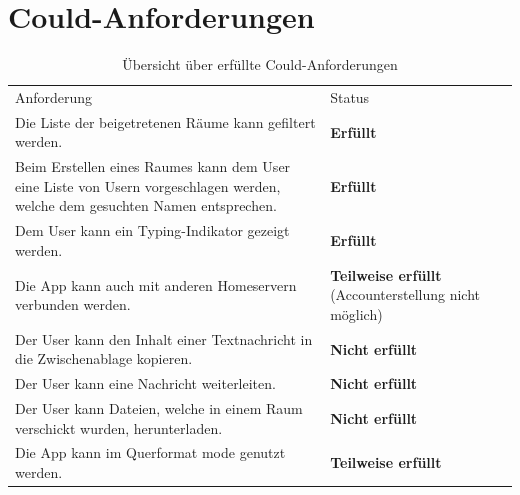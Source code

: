     \section{Could-Anforderungen}\label{sec:could-anforderungen}
    \begin{table}[h]
        \centering
        \begin{tabular}{p{}|p{}}
            Anforderung & Status\\
            \cline{1-2}
            Die Liste der beigetretenen Räume kann gefiltert werden. &  \textbf{Erfüllt} \\
            \cline{1-2}
            Beim Erstellen eines Raumes kann dem User eine Liste von Usern vorgeschlagen werden, welche dem gesuchten Namen entsprechen. & \textbf{Erfüllt}  \\
            \cline{1-2}
            Dem User kann ein Typing-Indikator gezeigt werden. &  \textbf{Erfüllt} \\
            \cline{1-2}
            Die App kann auch mit anderen Homeservern verbunden werden. & \textbf{Teilweise erfüllt} (Accounterstellung nicht möglich)\\
            \cline{1-2}
            Der User kann den Inhalt einer Textnachricht in die Zwischenablage kopieren. & \textbf{Nicht erfüllt} \\
            \cline{1-2}
            Der User kann eine Nachricht weiterleiten. & \textbf{Nicht erfüllt}  \\
            \cline{1-2}
            Der User kann Dateien, welche in einem Raum verschickt wurden, herunterladen. & \textbf{Nicht erfüllt}  \\
            \cline{1-2}
            Die App kann im Querformat mode genutzt werden. & \textbf{Teilweise erfüllt}
        \end{tabular}
        \caption{Übersicht über erfüllte Could-Anforderungen}
        \label{tab:erfüllte-could-anforderungen}
    \end{table}


